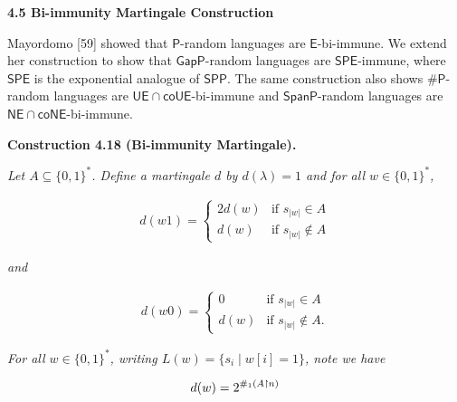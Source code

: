 \documentclass[10pt,a4paper]{article}
\begin{document}





\par\medskip\noindent\textbf{
4.5 Bi-immunity Martingale Construction}\par




Mayordomo [59] showed that $\mathsf{P}$-random languages are $\mathsf{E}$-bi-immune. We extend her construction to show that $\mathsf{GapP}$-random languages are $\mathsf{SPE}$-immune, where $\mathsf{SPE}$ is the exponential analogue of $\mathsf{SPP}$.
The same construction also shows ${\mathsf{\#}\mathsf{P}}$-random languages are $\mathsf{UE}\cap\mathsf{co}\mathsf{UE}$-bi-immune and $\mathsf{SpanP}$-random languages are $\mathsf{NE}\cap\mathsf{co}\mathsf{NE}$-bi-immune.\par





\par\medskip\noindent\textbf{
\textbf{Construction 4.18}\textbf{ }(Bi-immunity Martingale)\textbf{.}
}\par



\emph{Let $A\subseteq\{0,1\}^{*}$. Define a martingale $d$ by $d(\lambda)=1$ and for all $w\in\{0,1\}^{*}$,}\par


\[\begin{gathered}
d(w1)=\begin{cases}2d(w)&\textrm{if }s_{|w|}\in A\\
d(w)&\textrm{if }s_{|w|}\not\in A\end{cases}
\end{gathered}\]


\emph{and}\par


\[\begin{gathered}
d(w0)=\begin{cases}0&\textrm{if }s_{|w|}\in A\\
d(w)&\textrm{if }s_{|w|}\not\in A.\end{cases}
\end{gathered}\]


\emph{For all $w\in\{0,1\}^{*}$, writing $L(w)=\{s_{i}\mid w[i]=1\}$,
note we have}\par


\[\begin{gathered}
d(w)=2^{\#_{1}(A\thinspace\negthinspace\upharpoonright\negthinspace\thinspace n)}
\end{gathered}\]
\end{document}
